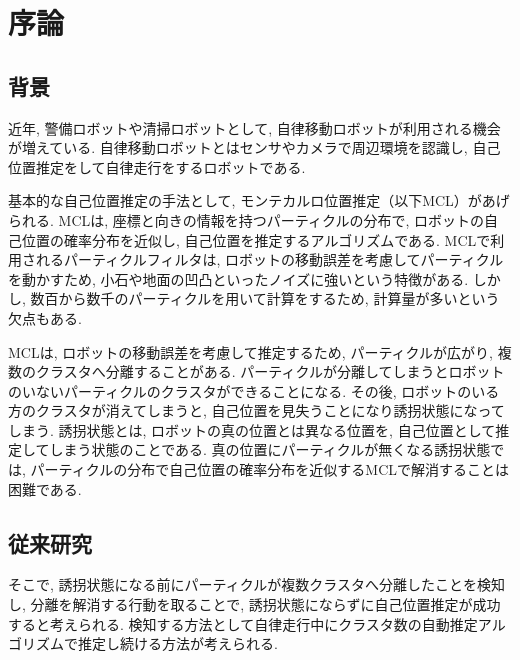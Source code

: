 \chapter{序論}
\section{背景}
近年, 警備ロボットや清掃ロボットとして, 自律移動ロボットが利用される機会が増えている. 
自律移動ロボットとはセンサやカメラで周辺環境を認識し, 自己位置推定をして自律走行をするロボットである. 

基本的な自己位置推定の手法として, モンテカルロ位置推定（以下MCL）があげられる. 
MCLは, 座標と向きの情報を持つパーティクルの分布で, ロボットの自己位置の確率分布を近似し, 自己位置を推定するアルゴリズムである.
MCLで利用されるパーティクルフィルタは, ロボットの移動誤差を考慮してパーティクルを動かすため, 小石や地面の凹凸といったノイズに強いという特徴がある. 
しかし, 数百から数千のパーティクルを用いて計算をするため, 計算量が多いという欠点もある.

MCLは, ロボットの移動誤差を考慮して推定するため, パーティクルが広がり, 複数のクラスタへ分離することがある. 
パーティクルが分離してしまうとロボットのいないパーティクルのクラスタができることになる. 
その後, ロボットのいる方のクラスタが消えてしまうと, 自己位置を見失うことになり誘拐状態になってしまう. 
誘拐状態とは, ロボットの真の位置とは異なる位置を, 自己位置として推定してしまう状態のことである.
真の位置にパーティクルが無くなる誘拐状態では, パーティクルの分布で自己位置の確率分布を近似するMCLで解消することは困難である. 


\section{従来研究}

そこで, 誘拐状態になる前にパーティクルが複数クラスタへ分離したことを検知し, 分離を解消する行動を取ることで, 誘拐状態にならずに自己位置推定が成功すると考えられる. 
検知する方法として自律走行中にクラスタ数の自動推定アルゴリズムで推定し続ける方法が考えられる. 

